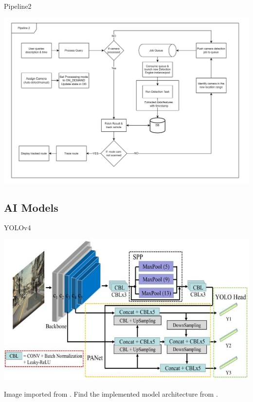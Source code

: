 \documentclass{beamer}
\newcommand{\link}[2]{\href{#1}{\textit{\color{blue}{#2}}}}%
\begin{document}
	\begin{frame}{Pipeline2}
		\begin{center}
			\includegraphics[width=\linewidth]{res/pipeline2}
		\end{center}
	\end{frame}

	\subsection{AI Models}
	\begin{frame}{YOLOv4}
		\begin{center}
			\includegraphics[width=0.8\linewidth]{res/YOLOV4-research-gate.png}
		\end{center}
		Image imported from \link{https://www.researchgate.net/figure/Overall-structure-of-YOLOv4-including-CSPDarknet-backbone-SPPnet-PANet-and-3-YOLO\_fig2\_344919620}{researchgate}. Find the implemented model architecture from .
	\end{frame}
	


\end{document}
